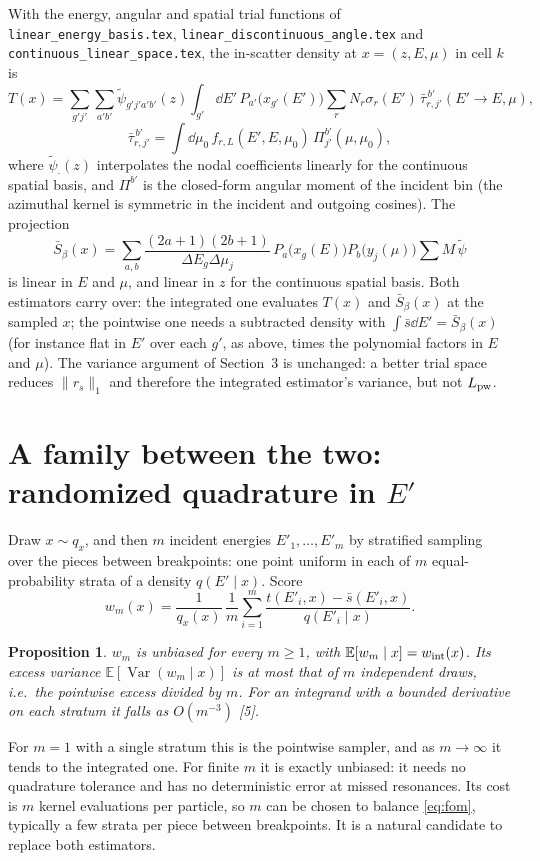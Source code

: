 \documentclass[11pt]{article}
\newtheorem{proposition}{Proposition}
\newcommand{\tpsi}{\tilde\psi}
\newcommand{\Sbar}{\bar S}
\newcommand{\E}{\mathbb{E}}
\newcommand{\Var}{\operatorname{Var}}
\begin{document}
With the energy, angular and spatial trial functions of \texttt{linear\_energy\_basis.tex},
\texttt{linear\_discontinuous\_angle.tex} and \texttt{continuous\_linear\_space.tex},
the in-scatter density at $x=(z,E,\mu)$ in cell $k$ is
\begin{equation}
  T(x) = \sum_{g'j'}\sum_{a'b'} \tpsi_{g'j'a'b'}(z)\int_{g'}\dd E'\,
  P_{a'}\big(x_{g'}(E')\big) \sum_r N_r\sigma_r(E')\,
  \bar\tau^{\,b'}_{r,j'}(E'\to E,\mu),
\end{equation}
\begin{equation}
  \bar\tau^{\,b'}_{r,j'} = \int\dd\mu_0\, f_{r,L}(E',E,\mu_0)\,
  \Pi^{b'}_{j'}(\mu,\mu_0),
\end{equation}
where $\tpsi_{\cdot}(z)$ interpolates the nodal coefficients linearly for the
continuous spatial basis, and $\Pi^{b'}$ is the closed-form angular moment of the
incident bin (the azimuthal kernel is symmetric in the incident and outgoing cosines).
The projection
\[
  \Sbar_\beta(x) = \sum_{a,b}\frac{(2a+1)(2b+1)}{\Delta E_g\Delta\mu_j}\,
  P_a\big(x_g(E)\big)P_b\big(y_j(\mu)\big)\sum M\,\tpsi
\]
is linear in $E$ and $\mu$, and linear in $z$ for the continuous spatial basis.
Both estimators carry over: the integrated one evaluates $T(x)$ and $\Sbar_\beta(x)$ at
the sampled $x$; the pointwise one needs a subtracted density with
$\int\bar s\dd E' = \Sbar_\beta(x)$ (for instance flat in $E'$ over each $g'$, as
above, times the polynomial factors in $E$ and $\mu$). The variance argument of
Section~3 is unchanged: a better trial space reduces $\|r_s\|_1$ and therefore the
integrated estimator's variance, but not $L_{\rm pw}$.

\section{A family between the two: randomized quadrature in $E'$}

Draw $x\sim q_x$, and then $m$ incident energies $E'_1,\dots,E'_m$ by stratified
sampling over the pieces between breakpoints: one point uniform in each of $m$
equal-probability strata of a density $q(E'\mid x)$. Score
\begin{equation}
  w_m(x) = \frac{1}{q_x(x)}\,\frac{1}{m}\sum_{i=1}^m
  \frac{t(E'_i,x) - \bar s(E'_i,x)}{q(E'_i\mid x)} .
\end{equation}
\begin{proposition}
$w_m$ is unbiased for every $m\ge 1$, with $\E[w_m\mid x] = w_{\rm int}(x)$. Its excess
variance $\E[\Var(w_m\mid x)]$ is at most that of $m$ independent draws, i.e.\ the
pointwise excess divided by $m$. For an integrand with a bounded derivative on each
stratum it falls as $O(m^{-3})$ [5].
\end{proposition}
\noindent For $m=1$ with a single stratum this is the pointwise sampler, and as
$m\to\infty$ it tends to the integrated one. For finite $m$ it is exactly unbiased: it
needs no quadrature tolerance and has no deterministic error at missed resonances.
Its cost is $m$ kernel evaluations per particle, so $m$ can be chosen to balance
\eqref{eq:fom}, typically a few strata per piece between breakpoints. It is a natural
candidate to replace both estimators.
\end{document}
